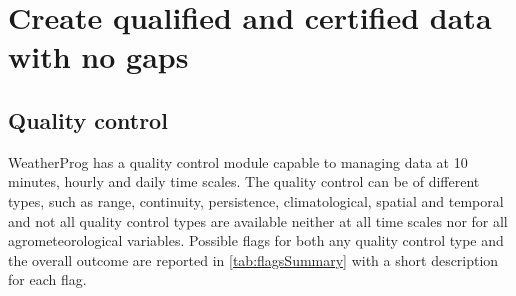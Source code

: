 \documentclass[authoryear,preprint,review,12pt]{elsarticle}
\newcommand{\note}[1]{\emph{\textcolor{red}{#1}}}
\begin{document}
\section{Create qualified and certified data with no gaps} \label{sec:qck+fill}

\subsection{Quality control} \label{sec:qcheck}
WeatherProg has a quality control module capable to managing data at 10 minutes, hourly and daily time scales.
The quality control can be of different types, such as range, continuity, persistence, climatological, spatial and temporal and not all quality control types are available neither at all time scales nor for all agrometeorological variables.
Possible flags for both any quality control type and the overall outcome are reported in \cref{tab:flagsSummary} with a short description for each flag.
\end{document}

